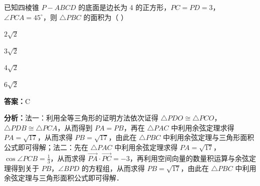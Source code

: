 \begin{question}[points=5]
已知四棱锥 $P-ABCD$ 的底面是边长为 4 的正方形，$PC = PD = 3$，$\angle PCA = 45^\circ$，则 $\triangle PBC$ 的面积为（         ）
\begin{choices}
  \item $2\sqrt{2}$
  \item $3\sqrt{2}$
  \item $4\sqrt{2}$
  \item $6\sqrt{2}$
\end{choices}
\begin{solution}
\textbf{答案：}C

\textbf{分析：}法一：利用全等三角形的证明方法依次证得 $\triangle PDO \cong \triangle PCO$，$\triangle PDB \cong \triangle PCA$，从而得到 $PA = PB$，再在 $\triangle PAC$ 中利用余弦定理求得 $PA = \sqrt{17}$，从而求得 $PB = \sqrt{17}$，由此在 $\triangle PBC$ 中利用余弦定理与三角形面积公式即可得解；法二：先在 $\triangle PAC$ 中利用余弦定理求得 $PA = \sqrt{17}$，$\cos \angle PCB = \frac{1}{3}$，从而求得 $\overrightarrow{PA}\cdot\overrightarrow{PC} = -3$，再利用空间向量的数量积运算与余弦定理得到关于 $PB$，$\angle BPD$ 的方程组，从而求得 $PB = \sqrt{17}$，由此在 $\triangle PBC$ 中利用余弦定理与三角形面积公式即可得解．


\end{solution}
\end{question}
